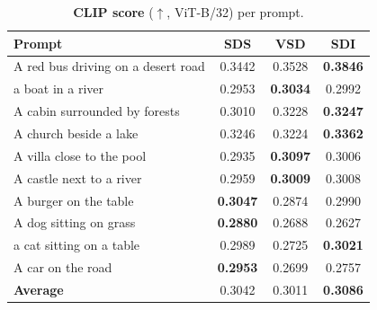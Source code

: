 \begin{table}[t]
  \centering
  \footnotesize
  \setlength{\tabcolsep}{4pt}
  \caption{\textbf{CLIP score} ($\uparrow$, ViT-B/32) per prompt.}
  \label{tab:clip}
  \begin{tabular}{@{}lccc@{}}
    \toprule
    Prompt & SDS & VSD & SDI \\
    \midrule
    A red bus driving on a desert road & 0.3442 & 0.3528 & \textbf{0.3846} \\
    a boat in a river & 0.2953 & \textbf{0.3034} & 0.2992 \\
    A cabin surrounded by forests & 0.3010 & 0.3228 & \textbf{0.3247} \\
    A church beside a lake & 0.3246 & 0.3224 & \textbf{0.3362} \\
    A villa close to the pool & 0.2935 & \textbf{0.3097} & 0.3006 \\
    A castle next to a river & 0.2959 & \textbf{0.3009} & 0.3008 \\
    A burger on the table & \textbf{0.3047} & 0.2874 & 0.2990 \\
    A dog sitting on grass & \textbf{0.2880} & 0.2688 & 0.2627 \\
    a cat sitting on a table & 0.2989 & 0.2725 & \textbf{0.3021} \\
    A car on the road & \textbf{0.2953} & 0.2699 & 0.2757 \\
    \midrule
    \textbf{Average} & 0.3042 & 0.3011 & \textbf{0.3086} \\
    \bottomrule
  \end{tabular}
\end{table}
